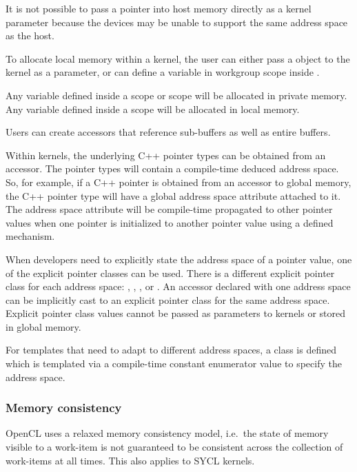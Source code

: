 It is not possible to pass a pointer into host memory directly as a kernel
parameter because the devices may be unable to support the same address space
as the host.

To allocate local memory within a kernel, the user can either pass
a  object to the kernel as a parameter, or
can define a variable in workgroup scope inside
.

Any variable defined inside a  scope or
 scope will be allocated in private
memory. Any variable defined inside a 
scope will be allocated in local memory.

Users can create accessors that reference sub-buffers as well as entire buffers.

Within kernels, the underlying C++ pointer types can be obtained from an
accessor. The pointer types will contain a compile-time deduced address space.
So, for example, if a C++ pointer is obtained from an accessor to global memory, 
the C++ pointer type will have a global address space attribute attached to it. 
The address space attribute will be compile-time propagated to other pointer
values when one pointer is initialized to another pointer value using a defined
mechanism.

When developers need to explicitly state the address space of a pointer value,
one of the explicit pointer classes can be used. There is a different explicit
pointer class for each address space: ,
, ,
or . An accessor declared with one
address space can be implicitly cast to an explicit pointer class
for the same address space. Explicit pointer class values cannot be passed
as parameters to kernels or stored in global memory.


For templates that need to adapt to different address spaces, a
 class is defined which is templated
via a compile-time constant enumerator value to specify the address space.

\subsubsection{Memory consistency}

OpenCL uses a relaxed memory consistency model, i.e.\ the state of
memory visible to a work-item is not guaranteed to be consistent
across the collection of work-items at all times. This also applies to
SYCL kernels.

